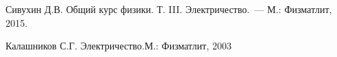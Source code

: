 \begin{lab:literature}
	\item{Сивухин Д.В. Общий курс физики. Т. III. Электричество.~--- М.: Физматлит, 2015}.
	\item{Калашников С.Г. Электричество.М.: Физматлит, 2003}
\end{lab:literature}

